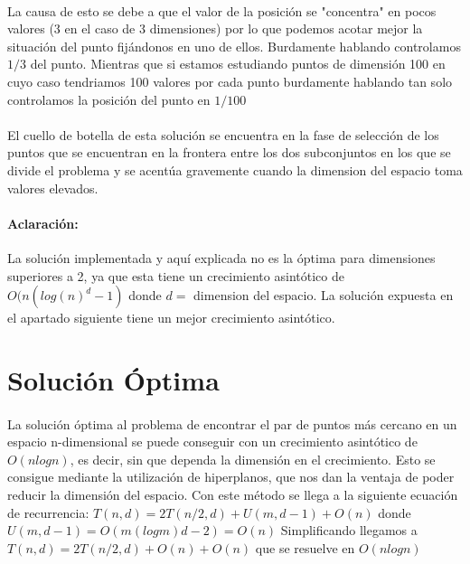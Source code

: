 \documentclass{article}
\begin{document}
		\paragraph{}
		La causa de esto se debe a que el valor de la posición se "concentra" en pocos valores (3 en el caso de 3 dimensiones) por lo que podemos acotar mejor la situación del punto fijándonos en uno de ellos. Burdamente hablando controlamos $1/3$ del punto. Mientras que si estamos estudiando puntos de dimensión 100 en cuyo caso tendriamos 100 valores por cada punto burdamente hablando tan solo controlamos la posición del punto en $1/100$
		
		\paragraph{}
		El cuello de botella de esta solución se encuentra en la fase de selección de los puntos que se encuentran en la frontera entre los dos subconjuntos en los que se divide el problema y se acentúa gravemente cuando la dimension del espacio toma valores elevados.
		
		\paragraph{Aclaración:}
		La solución implementada y aquí explicada no es la óptima para dimensiones superiores a 2, ya que esta tiene un crecimiento asintótico de $O(n(log(n)^d-1)$ donde $d = $ dimension del espacio. La solución expuesta en el apartado siguiente tiene un mejor crecimiento asintótico.
		
\section{Solución Óptima}
	\paragraph{}
	La solución óptima al problema de encontrar el par de puntos más cercano en un espacio n-dimensional se puede conseguir con un crecimiento asintótico de $O(nlogn)$, es decir, sin que dependa la dimensión en el crecimiento. Esto se consigue mediante la utilización de hiperplanos, que nos dan la ventaja de poder reducir la dimensión del espacio. Con este método se llega a la siguiente ecuación de recurrencia:
	$T(n, d) = 2T(n/2, d) + U(m, d - 1) + O(n)$ donde $U(m, d-1)=O(m (logm) d - 2) = O(n)$
	Simplificando llegamos a $T(n,d)=2T(n/2,d)+O(n)+O(n)$ que se resuelve en $O(nlogn)$ 
\end{document}
